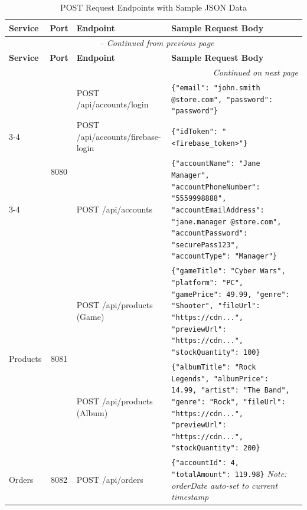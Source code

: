 
\begin{longtable}{|l|c|p{4.8cm}|p{5.5cm}|}
\caption{POST Request Endpoints with Sample JSON Data} \label{tab:post-endpoints} \\
\hline
\textbf{Service} & \textbf{Port} & \textbf{Endpoint} & \textbf{Sample Request Body} \\
\hline\hline
\endfirsthead

\multicolumn{4}{c}{\tablename\ \thetable{} -- \textit{Continued from previous page}} \\
\hline
\textbf{Service} & \textbf{Port} & \textbf{Endpoint} & \textbf{Sample Request Body} \\
\hline
\endhead

\hline
\multicolumn{4}{r}{\textit{Continued on next page}} \\
\endfoot

\hline
\endlastfoot

\multirow{3}{*}{Accounts}
 & \multirow{3}{*}{8080}
 & POST /api/accounts/login &
  \texttt{\{"email": "john.smith @store.com", "password": "password"\}} \\
\cline{3-4}
 & & POST /api/accounts/firebase-login &
  \texttt{\{"idToken": "<firebase\_token>"\}} \\
\cline{3-4}
 & & POST /api/accounts &
  \texttt{\{"accountName": "Jane Manager", "accountPhoneNumber": "5559998888", "accountEmailAddress": "jane.manager @store.com", "accountPassword": "securePass123", "accountType": "Manager"\}} \\
\hline

\multirow{2}{*}{Products}
 & \multirow{2}{*}{8081}
 & POST /api/products \newline (Game) &
  \texttt{\{"gameTitle": "Cyber Wars", "platform": "PC", "gamePrice": 49.99, "genre": "Shooter", "fileUrl": "https://cdn...", "previewUrl": "https://cdn...", "stockQuantity": 100\}} \\
\cline{3-4}
 & & POST /api/products \newline (Album) &
  \texttt{\{"albumTitle": "Rock Legends", "albumPrice": 14.99, "artist": "The Band", "genre": "Rock", "fileUrl": "https://cdn...", "previewUrl": "https://cdn...", "stockQuantity": 200\}} \\
\hline

Orders & 8082
 & POST /api/orders &
  \texttt{\{"accountId": 4, "totalAmount": 119.98\}} \newline
  \textit{Note: orderDate auto-set to current timestamp} \\
\hline


\end{longtable}
